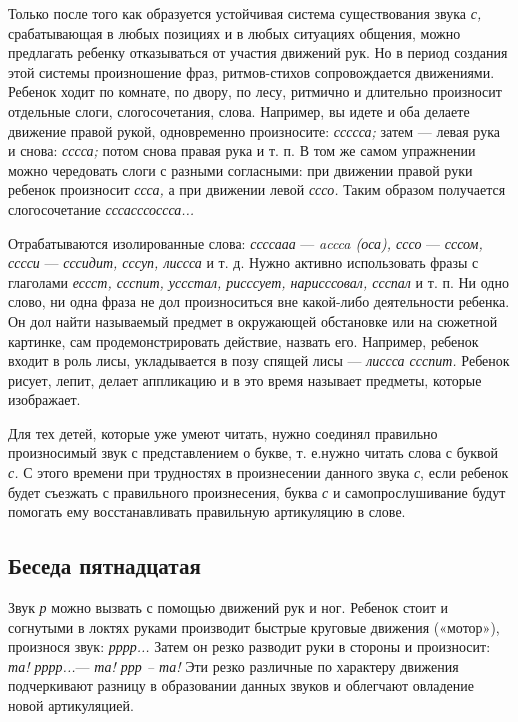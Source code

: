 \documentclass{book}
\renewcommand{\emph}[1]{\textit{#1}}
\begin{document}
Только после того как образуется устойчивая система существования звука
\emph{с,} срабатывающая в любых позициях и в любых ситуациях общения,
можно предлагать ребенку отказываться от участия движений рук. Но в
период создания этой системы произношение фраз, ритмов-стихов
сопровождается движениями. Ребенок ходит по комнате, по двору, по лесу,
ритмично и длительно произносит отдельные слоги, слогосочетания, слова.
Например, вы идете и оба делаете движение правой рукой, одновременно
произносите: \emph{ссссса;} затем --- левая рука и снова: \emph{сссса;}
потом снова правая рука и т. п. В том же самом упражнении можно
чередовать слоги с разными согласными: при движении правой руки ребенок
произносит \emph{ссса,} а при движении левой \emph{сссо.} Таким образом
получается слогосочетание \emph{сссасссоссса...}

Отрабатываются изолированные слова: \emph{ссссааа} --- \emph{accca
(оса), сссо} --- \emph{сссом, сссси} --- \emph{сссидит, сссуп, лиссса} и
т. д. Нужно активно использовать фразы с глаголами \emph{ессст, ссспит,
уссстал, рисссует, нарисссовал, ссспал} и т. п. Ни одно слово, ни одна
фраза не дол произноситься вне какой-либо деятельности ребенка. Он дол
найти называемый предмет в окружающей обстановке или на сюжетной
картинке, сам продемонстрировать действие, назвать его. Например,
ребенок входит в роль лисы, укладывается в позу спящей лисы ---
\emph{лиссса ссспит.} Ребенок рисует, лепит, делает аппликацию и в это
время называет предметы, которые изображает.

Для тех детей, которые уже умеют читать, нужно соединял правильно
произносимый звук с представлением о букве, т. е.нужно читать слова с
буквой \emph{с.} С этого времени при трудностях в произнесении данного
звука \emph{с}, если ребенок будет съезжать с правильного произнесения,
буква \emph{с} и самопрослушивание будут помогать ему восстанавливать
правильную артикуляцию в слове.

\subsection*{Беседа пятнадцатая}

Звук \emph{р} можно вызвать с помощью движений рук и ног. Ребенок стоит
и согнутыми в локтях руками производит быстрые круговые движения
(«мотор»), произнося звук: \emph{рррр...} Затем он резко разводит руки в
стороны и произносит: \emph{та! рррр...}--- \emph{та! ррр -- та!} Эти
резко различные по характеру движения подчеркивают разницу в образовании
данных звуков и облегчают овладение новой артикуляцией.
\end{document}
